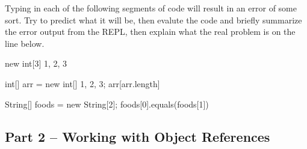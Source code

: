 \begin{eval}
Typing in each of the following segments of code will result in an error of some sort. Try to predict what it will be, then evalute the code and briefly summarize the error output from the REPL, then  explain what the real problem is on the line below.

\begin{sevalenum}

\item 

\begin{code}
new int[3] {1, 2, 3}
\end{code}
\evallinethree


\item 

\begin{code}
int[] arr = new int[] {1, 2, 3};
arr[arr.length]
\end{code}
\evallinethree



\item 

\begin{code}
String[] foods = new String[2];
foods[0].equals(foods[1])
\end{code}
\evallinethree

\end{sevalenum}
\end{eval}


\initialbox

\subsection{Part 2 -- Working with Object References}


